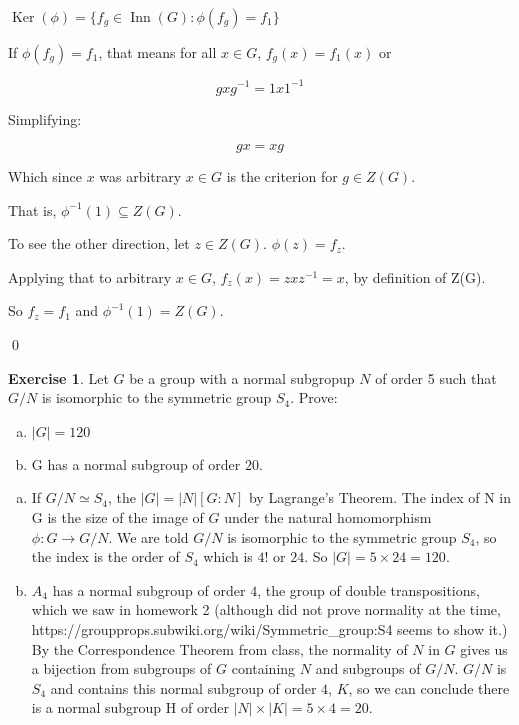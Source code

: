 \documentclass[11pt,oneside]{article}
\numberwithin{equation}{section}
\theoremstyle{definition}
\newtheorem{exercise}{Exercise}
\def\Inn{\operatorname{Inn}}
\def\Ker{\operatorname{Ker}}
\begin{document}
\begin{solution}
\begin{enumerate}[(a)]
\begin{itemize}
\begin{itemize}
        $ \Ker(\phi) = \{ f_g \in \Inn(G) : \phi(f_g) = f_1 \}  $
        
        If $\phi(f_g) = f_1$, that means for all $x \in G$, $f_g(x) = f_1(x)$ or
        
        $$
        gxg^{-1} = 1x1^{-1}
        $$
        
        Simplifying:
        
        $$
        gx = xg
        $$
        
        Which since $x$ was arbitrary $x \in G$ is the criterion for $ g \in Z(G)$.
        
        That is, $\phi ^ {-1}(1) \subseteq  Z(G)$.
        
        To see the other direction, let $z \in Z(G)$.  $\phi(z) = f_z$.
        
        Applying that to arbitrary $x \in G$, $f_z(x) = zxz^{-1} = x$, by definition of Z(G).
        
        So $f_z = f_1$ and $\phi^{-1} (1) = Z(G)$.
        
        \qed
        
      \end{itemize}
    \end{itemize}
  \end{enumerate}
\end{solution}
  
\begin{exercise}
  Let $G$ be a group with a normal subgropup $N$ of order 5 such that $G/N$ is isomorphic to the
  symmetric group $S_4$.  Prove:
  \begin{enumerate}[(a)]
  \item
    $|G| = 120$
  \item
    G has a normal subgroup of order $20$.  
  \end{enumerate}
\end{exercise}
\begin{solution}
  \begin{enumerate}[(a)]
  \item
    If $G/N \simeq S_4$, the $|G| = |N| [G:N]$ by Lagrange's
    Theorem.  The index of N in G is the size of the image of $G$
    under the natural homomorphism $\phi: G \to G/N$.  We are told
    $G/N$ is isomorphic to the symmetric group $S_4$, so the index is the
    order of $S_4$ which is $4!$ or $24$.  So $|G| = 5 \times 24 = 120$.
  \item
    $A_4$ has a normal subgroup of order $4$, the group of double
    transpositions, which we saw in homework 2 (although did not
    prove normality at the time,
    https://groupprops.subwiki.org/wiki/Symmetric\_group:S4 seems to
    show it.)  By the Correspondence Theorem from class, the normality of $N$
    in $G$ gives us a bijection from subgroups of $G$ containing $N$
    and subgroups of $G/N$.  $G/N$ is $S_4$ and contains this normal
    subgroup of order $4$, $K$, so we can conclude there is a normal subgroup H
    of order $ |N| \times  |K| = 5 \times 4 = 20$.  
  \end{enumerate}
\end{solution}
\end{document}
